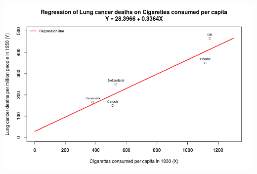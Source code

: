 \documentclass[12pt]{article}
\begin{document}
\begin{center}
  \includegraphics[width=15cm]{graph1}
\end{center}
\end{document}
